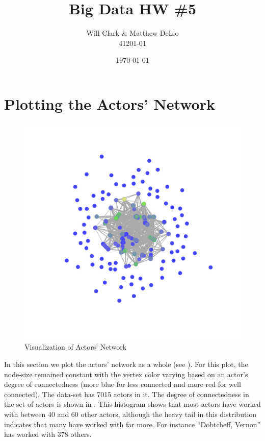 \documentclass[11pt, fleqn]{article}\usepackage[]{graphicx}\usepackage[]{color}
\title{Big Data HW \#5}
\author{Will Clark \& Matthew DeLio \\ 41201-01}
\date{\today}
\newenvironment{knitrout}{}{} %
\begin{document}
\maketitle







\section{Plotting the Actors' Network}
\begin{knitrout}
\color{fgcolor}\begin{figure}

{\centering \includegraphics[width=.98\linewidth]{figure/all_actors-1} 

}

\caption[Visualization of Actors' Network]{Visualization of Actors' Network}\label{fig:all_actors}
\end{figure}


\end{knitrout}



In this section we plot the actors' network as a whole (see ).  For this plot, the node-size remained constant with the vertex color varying based on an actor's degree of connectedness (more blue for less connected and more red for well connected).  The data-set has 7015 actors in it.  The degree of connectedness in the set of actors is shown in .  This histogram shows that most actors have worked with between 40 and 60 other actors, although the heavy tail in this distribution indicates that many have worked with far more.  For instance ``Dobtcheff, Vernon'' has worked with 378 others.
\end{document}
